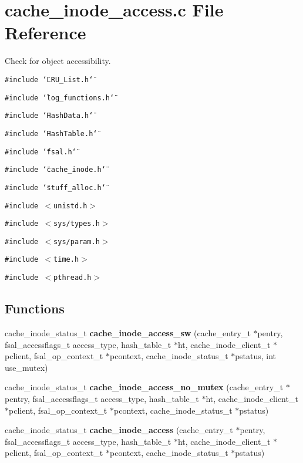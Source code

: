 \section{cache\_\-inode\_\-access.c File Reference}
\label{cache__inode__access_8c}
Check for object accessibility. 

{\tt \#include \char`\"{}LRU\_\-List.h\char`\"{}}\par
{\tt \#include \char`\"{}log\_\-functions.h\char`\"{}}\par
{\tt \#include \char`\"{}Hash\-Data.h\char`\"{}}\par
{\tt \#include \char`\"{}Hash\-Table.h\char`\"{}}\par
{\tt \#include \char`\"{}fsal.h\char`\"{}}\par
{\tt \#include \char`\"{}cache\_\-inode.h\char`\"{}}\par
{\tt \#include \char`\"{}stuff\_\-alloc.h\char`\"{}}\par
{\tt \#include $<$unistd.h$>$}\par
{\tt \#include $<$sys/types.h$>$}\par
{\tt \#include $<$sys/param.h$>$}\par
{\tt \#include $<$time.h$>$}\par
{\tt \#include $<$pthread.h$>$}\par
\subsection*{Functions}
\begin{CompactItemize}
\item 
cache\_\-inode\_\-status\_\-t {\bf cache\_\-inode\_\-access\_\-sw} (cache\_\-entry\_\-t $\ast$pentry, fsal\_\-accessflags\_\-t access\_\-type, hash\_\-table\_\-t $\ast$ht, cache\_\-inode\_\-client\_\-t $\ast$pclient, fsal\_\-op\_\-context\_\-t $\ast$pcontext, cache\_\-inode\_\-status\_\-t $\ast$pstatus, int use\_\-mutex)
\item 
cache\_\-inode\_\-status\_\-t {\bf cache\_\-inode\_\-access\_\-no\_\-mutex} (cache\_\-entry\_\-t $\ast$pentry, fsal\_\-accessflags\_\-t access\_\-type, hash\_\-table\_\-t $\ast$ht, cache\_\-inode\_\-client\_\-t $\ast$pclient, fsal\_\-op\_\-context\_\-t $\ast$pcontext, cache\_\-inode\_\-status\_\-t $\ast$pstatus)
\item 
cache\_\-inode\_\-status\_\-t {\bf cache\_\-inode\_\-access} (cache\_\-entry\_\-t $\ast$pentry, fsal\_\-accessflags\_\-t access\_\-type, hash\_\-table\_\-t $\ast$ht, cache\_\-inode\_\-client\_\-t $\ast$pclient, fsal\_\-op\_\-context\_\-t $\ast$pcontext, cache\_\-inode\_\-status\_\-t $\ast$pstatus)
\end{CompactItemize}


